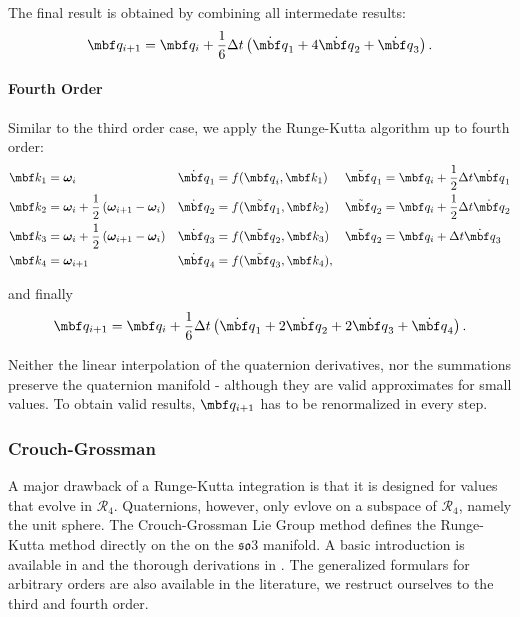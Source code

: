 \documentclass[10pt,a4paper]{article}
\newcommand{\mbs}[1]{{\boldsymbol{#1}}}
\numberwithin{equation}{section}
\begin{document}
The final result is obtained by combining all intermedate results:
\begin{equation}
\mbf q_{i+1} = \mbf q_i + \dfrac{1}{6} \Delta t \left(
	\dot{\mbf q}_1 +
	4 \dot{\mbf q}_2 +
	\dot{\mbf q}_3
\right).
\label{eq:rk3}
\end{equation}

\paragraph{Fourth Order}
Similar to the third order case, we apply the Runge-Kutta algorithm up to fourth order:
\begin{align*}
\mbf k_1 &= \mbs \omega_i &
\dot{\mbf q}_1 &= f({\mbf q}_i , \mbf k_1) &
\tilde{\mbf q}_1 &= \mbf q_i +\dfrac{1}{2} \Delta t \dot{\mbf q}_1 \\
\mbf k_2 &= \mbs \omega_i + \dfrac{1}{2}\left( \mbs \omega_{i+1} - \mbs \omega_i \right) &
\dot{\mbf q}_2 &= f(\tilde{\mbf q}_1, \mbf k_2) &
\tilde{\mbf q}_2 &= \mbf q_i +\dfrac{1}{2} \Delta t \dot{\mbf q}_2 \\
\mbf k_3 &= \mbs \omega_i + \dfrac{1}{2}\left( \mbs \omega_{i+1} - \mbs \omega_i \right) &
\dot{\mbf q}_3 &= f(\tilde{\mbf q}_2, \mbf k_3) &
\tilde{\mbf q}_2 &= \mbf q_i + \Delta t \dot{\mbf q}_3 \\
\mbf k_4  &=  \mbs \omega_{i+1} &
\dot{\mbf q}_4 &= f(\tilde{\mbf q}_3 , \mbf k_4), &
\end{align*}

and finally
\begin{equation}
\mbf q_{i+1} = \mbf q_i + \dfrac{1}{6} \Delta t \left(
	\dot{\mbf q}_1 +
	2 \dot{\mbf q}_2 +
	2 \dot{\mbf q}_3 +
	\dot{\mbf q}_4
\right).
\label{eq:rk4}
\end{equation}

Neither the linear interpolation of the quaternion derivatives, nor the summations preserve the quaternion manifold - although they are valid approximates for small values. To obtain valid results, $\mbf q_{i+1}$ has to be renormalized in every step.

\subsubsection{Crouch-Grossman}

A major drawback of a Runge-Kutta integration is that it is designed for values that evolve in $\mathcal{R}_4$.
Quaternions, however, only evlove on a subspace of $\mathcal{R}_4$, namely the unit sphere.
The Crouch-Grossman Lie Group method defines the Runge-Kutta method directly on the on the $\mathfrak{so}3$ manifold.
A basic introduction is available in \cite{andrle_crassidist} and the thorough derivations in \cite{crouch_grossman}.
The generalized formulars for arbitrary orders are also available in the literature, we restruct ourselves to the third and fourth order.
\end{document}
